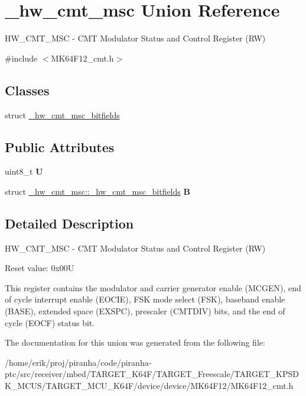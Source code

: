 \hypertarget{union__hw__cmt__msc}{}\section{\+\_\+hw\+\_\+cmt\+\_\+msc Union Reference}
\label{union__hw__cmt__msc}


H\+W\+\_\+\+C\+M\+T\+\_\+\+M\+SC -\/ C\+MT Modulator Status and Control Register (RW)  




{\ttfamily \#include $<$M\+K64\+F12\+\_\+cmt.\+h$>$}

\subsection*{Classes}
\begin{DoxyCompactItemize}
\item 
struct \hyperlink{struct__hw__cmt__msc_1_1__hw__cmt__msc__bitfields}{\+\_\+hw\+\_\+cmt\+\_\+msc\+\_\+bitfields}
\end{DoxyCompactItemize}
\subsection*{Public Attributes}
\begin{DoxyCompactItemize}
\item 
uint8\+\_\+t {\bfseries U}\hypertarget{union__hw__cmt__msc_ad710c55319f2d65d4bdd89c7d10e17b3}{}\label{union__hw__cmt__msc_ad710c55319f2d65d4bdd89c7d10e17b3}

\item 
struct \hyperlink{struct__hw__cmt__msc_1_1__hw__cmt__msc__bitfields}{\+\_\+hw\+\_\+cmt\+\_\+msc\+::\+\_\+hw\+\_\+cmt\+\_\+msc\+\_\+bitfields} {\bfseries B}\hypertarget{union__hw__cmt__msc_a32cc4e30895bdf17a851c97de0ddf5dd}{}\label{union__hw__cmt__msc_a32cc4e30895bdf17a851c97de0ddf5dd}

\end{DoxyCompactItemize}


\subsection{Detailed Description}
H\+W\+\_\+\+C\+M\+T\+\_\+\+M\+SC -\/ C\+MT Modulator Status and Control Register (RW) 

Reset value\+: 0x00U

This register contains the modulator and carrier generator enable (M\+C\+G\+EN), end of cycle interrupt enable (E\+O\+C\+IE), F\+SK mode select (F\+SK), baseband enable (B\+A\+SE), extended space (E\+X\+S\+PC), prescaler (C\+M\+T\+D\+IV) bits, and the end of cycle (E\+O\+CF) status bit. 

The documentation for this union was generated from the following file\+:\begin{DoxyCompactItemize}
\item 
/home/erik/proj/piranha/code/piranha-\/ptc/src/receiver/mbed/\+T\+A\+R\+G\+E\+T\+\_\+\+K64\+F/\+T\+A\+R\+G\+E\+T\+\_\+\+Freescale/\+T\+A\+R\+G\+E\+T\+\_\+\+K\+P\+S\+D\+K\+\_\+\+M\+C\+U\+S/\+T\+A\+R\+G\+E\+T\+\_\+\+M\+C\+U\+\_\+\+K64\+F/device/device/\+M\+K64\+F12/M\+K64\+F12\+\_\+cmt.\+h\end{DoxyCompactItemize}

